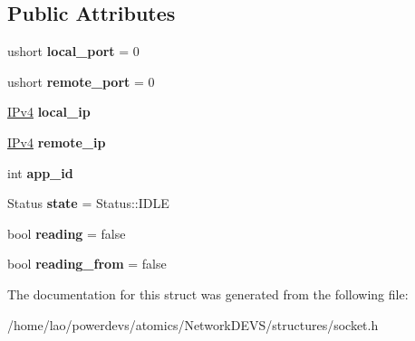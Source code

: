 \subsection*{Public Attributes}
\begin{DoxyCompactItemize}
\item 
ushort {\bfseries local\+\_\+port} = 0\hypertarget{structudp_1_1Socket_a9e707b4535b96737511e71b3f5603568}{}\label{structudp_1_1Socket_a9e707b4535b96737511e71b3f5603568}

\item 
ushort {\bfseries remote\+\_\+port} = 0\hypertarget{structudp_1_1Socket_a1ee80e71898b38176c69f28d71dafc71}{}\label{structudp_1_1Socket_a1ee80e71898b38176c69f28d71dafc71}

\item 
\hyperlink{structIPv4}{I\+Pv4} {\bfseries local\+\_\+ip}\hypertarget{structudp_1_1Socket_a540d11e152b828544286156c0c7c5cf2}{}\label{structudp_1_1Socket_a540d11e152b828544286156c0c7c5cf2}

\item 
\hyperlink{structIPv4}{I\+Pv4} {\bfseries remote\+\_\+ip}\hypertarget{structudp_1_1Socket_afb4311751f2fe800085edc726f1c29f6}{}\label{structudp_1_1Socket_afb4311751f2fe800085edc726f1c29f6}

\item 
int {\bfseries app\+\_\+id}\hypertarget{structudp_1_1Socket_a381ca87c16323934dc91465c404062bb}{}\label{structudp_1_1Socket_a381ca87c16323934dc91465c404062bb}

\item 
Status {\bfseries state} = Status\+::\+I\+D\+LE\hypertarget{structudp_1_1Socket_a11a9fa6524bc2a95144d35d16c62e86b}{}\label{structudp_1_1Socket_a11a9fa6524bc2a95144d35d16c62e86b}

\item 
bool {\bfseries reading} = false\hypertarget{structudp_1_1Socket_a350bf97114515c291e254256933247e2}{}\label{structudp_1_1Socket_a350bf97114515c291e254256933247e2}

\item 
bool {\bfseries reading\+\_\+from} = false\hypertarget{structudp_1_1Socket_a925962404f3489233d3d17c16ec58dd4}{}\label{structudp_1_1Socket_a925962404f3489233d3d17c16ec58dd4}

\end{DoxyCompactItemize}


The documentation for this struct was generated from the following file\+:\begin{DoxyCompactItemize}
\item 
/home/lao/powerdevs/atomics/\+Network\+D\+E\+V\+S/structures/socket.\+h\end{DoxyCompactItemize}
